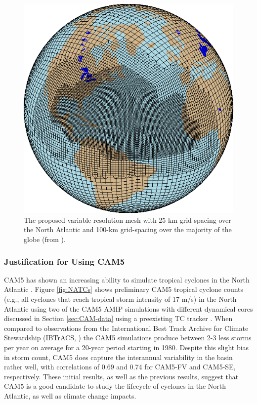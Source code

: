 \documentclass[11pt]{article}
\begin{document}
\begin{figure}[h]
\begin{center}
\includegraphics[width=2.in]{NA_mesh.eps}
\end{center}
\caption{The proposed variable-resolution mesh with 25 km grid-spacing over the North Atlantic and 100-km grid-spacing over the majority of the globe (from \citet{Zarzycki2014multidecadal}).} \label{fig:NA_mesh}
\end{figure}

\subsubsection{Justification for Using CAM5}

CAM5 has shown an increasing ability to simulate tropical cyclones in the North Atlantic \citep{Bacmeister2014,Wehner2014,Reed2015b}.  Figure \ref{fig:NATCs} shows preliminary CAM5 tropical cyclone counts (e.g., all cyclones that reach tropical storm intensity of 17 m/s) in the North Atlantic using two of the CAM5 AMIP simulations with different dynamical cores discussed in Section \ref{sec:CAM-data} using a preexisting TC tracker \citep{Zhao2009}. When compared to observations from the International Best Track Archive for Climate Stewardship (IBTrACS, \citet{Knapp2010}) the CAM5 simulations produce between 2-3 less storms per year on average for a 20-year period starting in 1980. Despite this slight bias in storm count, CAM5 does capture the interannual variability in the basin rather well, with correlations of 0.69 and 0.74 for CAM5-FV and CAM5-SE, respectively. These initial results, as well as the previous results, suggest that CAM5 is a good candidate to study the lifecycle of cyclones in the North Atlantic, as well as climate change impacts.
\end{document}
